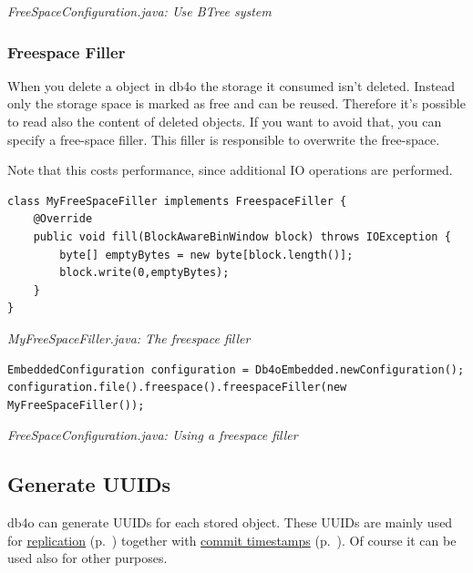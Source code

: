 {\small\itshape FreeSpaceConfiguration.java: Use BTree system\par}
\medskip

\subsubsection{Freespace Filler}
\label{ref:configuration-file-freespace-configuration:filler}

When you delete a object in db4o the storage it consumed isn't deleted. Instead only the storage space is marked as free and can be reused. Therefore it's possible to read also the content of deleted objects. If you want to avoid that, you can specify a free-space filler. This filler is responsible to overwrite the free-space.

Note that this costs performance, since additional IO operations are performed.

\begin{lstlisting}
class MyFreeSpaceFiller implements FreespaceFiller {
    @Override
    public void fill(BlockAwareBinWindow block) throws IOException {
        byte[] emptyBytes = new byte[block.length()];
        block.write(0,emptyBytes);
    }
}
\end{lstlisting}

{\small\itshape MyFreeSpaceFiller.java: The freespace filler\par}
\medskip

\begin{lstlisting}
EmbeddedConfiguration configuration = Db4oEmbedded.newConfiguration();
configuration.file().freespace().freespaceFiller(new MyFreeSpaceFiller());
\end{lstlisting}

{\small\itshape FreeSpaceConfiguration.java: Using a freespace filler\par}
\medskip

\subsection{Generate UUIDs}
\label{ref:configuration-file-generate-uuids}

db4o can generate UUIDs for each stored object. These UUIDs are mainly used for \hyperref[drs:welcome]{replication} (p.~\pageref{drs:welcome}) together with \hyperref[ref:configuration-file-generate-timestamps]{commit timestamps} (p.~\pageref{ref:configuration-file-generate-timestamps}). Of course it can be used also for other purposes.

